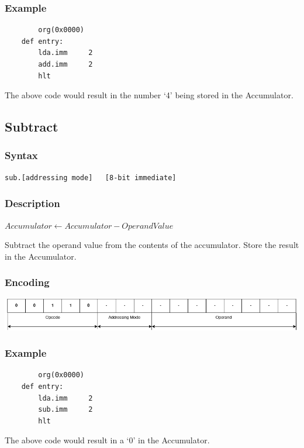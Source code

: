     \subsubsection{Example}
    \begin{verbatim}
        org(0x0000)
    def entry:
        lda.imm     2
        add.imm     2
        hlt
    \end{verbatim}
    \par The above code would result in the number `4' being stored in the Accumulator.

\pagebreak
\subsection{Subtract}\label{subsec:sub}
    \subsubsection{Syntax}
    \begin{verbatim}sub.[addressing mode]   [8-bit immediate]\end{verbatim}

    \subsubsection{Description}
    $Accumulator \leftarrow Accumulator - OperandValue$
    \par Subtract the operand value from the contents of the accumulator.
    Store the result in the Accumulator.

    \subsubsection{Encoding}
    \begin{center}
        \includegraphics[scale=0.40]{img/Andromeda-SUB.drawio}
    \end{center}

    \subsubsection{Example}
    \begin{verbatim}
        org(0x0000)
    def entry:
        lda.imm     2
        sub.imm     2
        hlt
    \end{verbatim}
    \par The above code would result in a `0' in the Accumulator.

